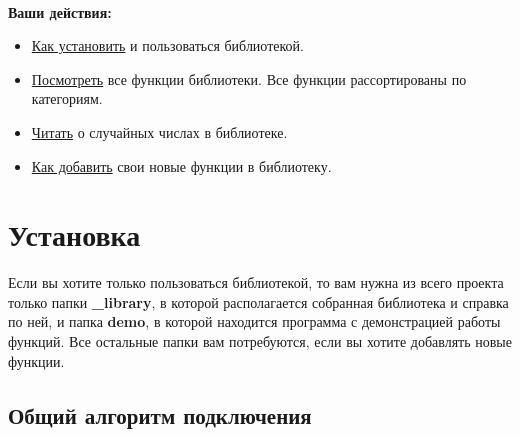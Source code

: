 \documentclass[a4paper,12pt]{article}
\begin{document}
~\\

\textbf{Ваши действия:}

\begin{itemize}
\item \hyperref[section_install]{Как установить} и пользоваться библиотекой.
\item \hyperref[section_listfunctions]{Посмотреть} все функции библиотеки. Все функции рассортированы по категориям.
\item \hyperref[section_random]{Читать} о случайных числах в библиотеке.
\item \hyperref[section_addnew]{Как добавить} свои новые функции в библиотеку.
\end{itemize}

\newpage
\section{Установка}\label{section_install}

Если вы хотите только пользоваться библиотекой, то вам нужна из всего проекта только папки \textbf{\_library}, в которой располагается собранная библиотека и справка по ней, и папка \textbf{demo}, в которой находится программа с демонстрацией работы функций. Все остальные папки вам потребуются, если вы хотите добавлять новые функции.

\subsection{Общий алгоритм подключения}
\end{document}
